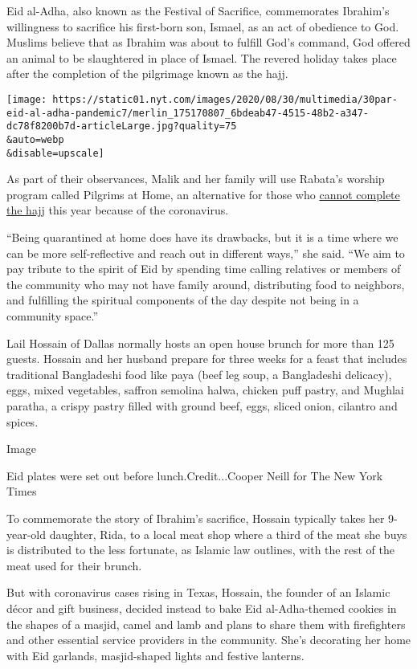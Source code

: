 Eid al-Adha, also known as the Festival of Sacrifice, commemorates
Ibrahim's willingness to sacrifice his first-born son, Ismael, as an act
of obedience to God. Muslims believe that as Ibrahim was about to
fulfill God's command, God offered an animal to be slaughtered in place
of Ismael. The revered holiday takes place after the completion of the
pilgrimage known as the hajj.

\texttt{[image: https://static01.nyt.com/images/2020/08/30/multimedia/30par-eid-al-adha-pandemic7/merlin\_175170807\_6bdeab47-4515-48b2-a347-dc78f8200b7d-articleLarge.jpg?quality=75\\\&auto=webp\\\&disable=upscale]}

As part of their observances, Malik and her family will use Rabata's
worship program called Pilgrims at Home, an alternative for those who
\href{https://www.nytimes.com/2020/06/23/world/middleeast/hajj-pilgrimage-canceled.html}{cannot
complete the hajj} this year because of the coronavirus.

``Being quarantined at home does have its drawbacks, but it is a time
where we can be more self-reflective and reach out in different ways,''
she said. ``We aim to pay tribute to the spirit of Eid by spending time
calling relatives or members of the community who may not have family
around, distributing food to neighbors, and fulfilling the spiritual
components of the day despite not being in a community space.''

Lail Hossain of Dallas normally hosts an open house brunch for more than
125 guests. Hossain and her husband prepare for three weeks for a feast
that includes traditional Bangladeshi food like paya (beef leg soup, a
Bangladeshi delicacy), eggs, mixed vegetables, saffron semolina halwa,
chicken puff pastry, and Mughlai paratha, a crispy pastry filled with
ground beef, eggs, sliced onion, cilantro and spices.

Image

Eid plates were set out before lunch.Credit...Cooper Neill for The New
York Times

To commemorate the story of Ibrahim's sacrifice, Hossain typically takes
her 9-year-old daughter, Rida, to a local meat shop where a third of the
meat she buys is distributed to the less fortunate, as Islamic law
outlines, with the rest of the meat used for their brunch.

But with coronavirus cases rising in Texas, Hossain, the founder of an
Islamic décor and gift business, decided instead to bake Eid
al-Adha-themed cookies in the shapes of a masjid, camel and lamb and
plans to share them with firefighters and other essential service
providers in the community. She's decorating her home with Eid garlands,
masjid-shaped lights and festive lanterns.

